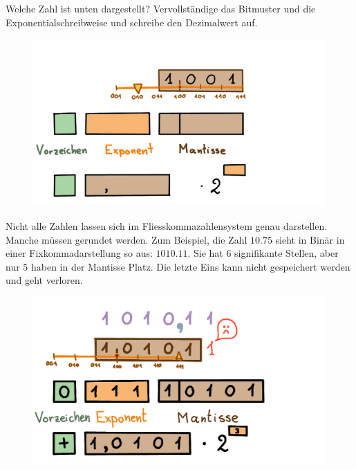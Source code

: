 \begin{aufgabe}\label{einleitung-vom-kasten-nach-zahl}
Welche Zahl ist unten dargestellt? Vervollständige das Bitmuster und die Exponentialschreibweise und schreibe den Dezimalwert auf.

\begin{figure}[H]
\centering
\includegraphics[width=0.8\linewidth]{Pictures/Einleitung_from_Kasten.png} 
\end{figure}
\end{aufgabe}

\begin{beispiel}
Nicht alle Zahlen lassen sich im Fliesskommazahlensystem genau darstellen. Manche müssen gerundet werden.
Zum Beispiel, die Zahl \(10.75\) sieht in Binär in einer Fixkommadarstellung so aus: \(1010.11\). Sie hat \(6\) signifikante Stellen, aber nur \(5\) haben in der Mantisse Platz. Die letzte Eins kann nicht gespeichert werden und geht verloren.
\begin{figure}[H]
\centering
\includegraphics[width=0.75\linewidth]{Pictures/ZahlenDarstellen10-75.png} 
\end{figure}

\end{beispiel}